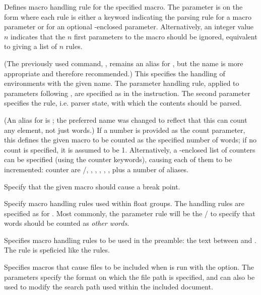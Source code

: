 
\begin{description}
\sloppy

Defines macro handling rule for the specified macro. The parameter is on the form  where each rule is either a keyword indicating the parsing rule for a macro parameter or  for an optional \code{[]}-enclosed parameter. Alternatively, an integer value $n$ indicates that the $n$ first parameters to the macro should be ignored, equivalent to giving a list of $n$  rules.

(The previously used command, , remains an alias for , but the name  is more appropriate and therefore recommended.)
This specifies the handling of environments with the given name. The parameter handling rule, applied to parameters following , are specified as in the  instruction. The second parameter specifies the rule, i.e. parser state, with which the contents should be parsed.

(An alias for  is ; the preferred name was changed to reflect that this can count any element, not just words.)
If a number is provided as the count parameter, this defines the given macro to be counted as the specified number of words; if no count is specified, it is assumed to be 1. Alternatively, a \code{[]}-enclosed list of counters can be specified (using the counter keywords), causing each of them to be incremented: counter are /, , , , , ,  plus a number of aliases.

Specify that the given macro should cause a break point.

Specify macro handling rules used within float groups. The handling rules are specified as for . Most commonly, the parameter rule will be the / to specify that words should be counted as \textit{other words}.

Specifies macro handling rules to be used in the preamble: the text between  and . The rule is speficied like the  rules.

Specifies macros that cause files to be included when \TeXcount{} is run with the  option. The parameters specify the format on which the file path is specified, and can also be used to modify the search path used within the included document.

\end{description}
